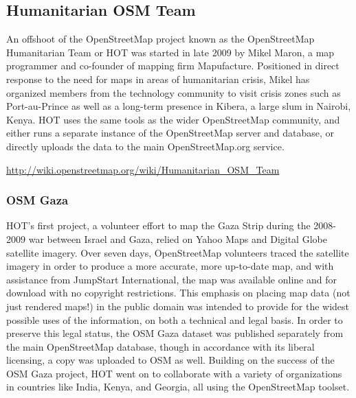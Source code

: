 \documentclass[11pt,oneside,notitlepage]{report}
\begin{document}
\subsection{Humanitarian OSM Team}
 
An offshoot of the OpenStreetMap project known as the OpenStreetMap Humanitarian Team or HOT was started in late 2009 by Mikel Maron, a map programmer and co-founder of mapping firm Mapufacture. Positioned in direct response to the need for maps in areas of humanitarian crisis, Mikel has organized members from the technology community to visit crisis zones such as Port-au-Prince as well as a long-term presence in Kibera, a large slum in Nairobi, Kenya. HOT uses the same tools as the wider OpenStreetMap community, and either runs a separate instance of the OpenStreetMap server and database, or directly uploads the data to the main OpenStreetMap.org service. 

\url{http://wiki.openstreetmap.org/wiki/Humanitarian_OSM_Team}

\subsubsection{OSM Gaza}

HOT's first project, a volunteer effort to map the Gaza Strip during the 2008-2009 war between Israel and Gaza, relied on Yahoo Maps and Digital Globe satellite imagery. Over seven days, OpenStreetMap volunteers traced the satellite imagery in order to produce a more accurate, more up-to-date map, and with assistance from JumpStart International, the map was available online and for download with no copyright restrictions. \cite{chilton-crowdsourcing} This emphasis on placing map data (not just rendered maps!) in the public domain was intended to provide for the widest possible uses of the information, on both a technical and legal basis. In order to preserve this legal status, the OSM Gaza dataset was published separately from the main OpenStreetMap database, though in accordance with its liberal licensing, a copy was uploaded to OSM as well. Building on the success of the OSM Gaza project, HOT went on to collaborate with a variety of organizations in countries like India, Kenya, and Georgia, all using the OpenStreetMap toolset. 
\end{document}
